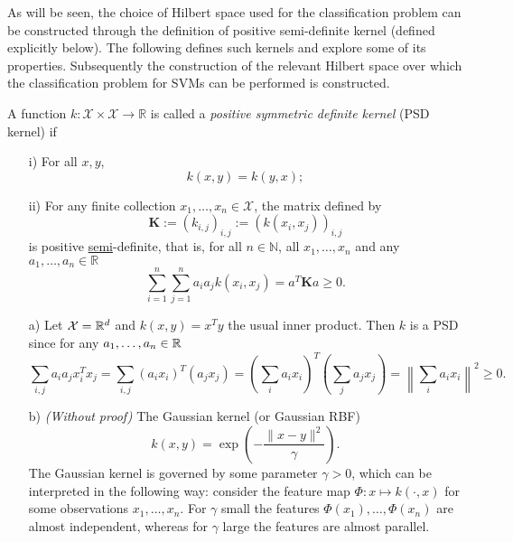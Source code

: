 As will be seen, the choice of Hilbert space used for the classification problem can be constructed through the definition of positive semi-definite kernel (defined explicitly below).  The following defines such kernels and explore some of its properties. Subsequently the construction of the relevant Hilbert space over which the classification problem for SVMs can be performed is constructed. 

\begin{definition}
A function $k\colon \mathcal{X}\times \mathcal{X} \rightarrow \mathbb{R}$ is called a \emph{positive symmetric definite kernel} (PSD kernel) if 
\begin{itemize}
	\item[i)] For all $x, y$, $$k(x, y)=k(y, x);$$
	\item[ii)] For any finite collection $x_1, \ldots, x_n \in \mathcal{X}$, the matrix defined by
	\begin{equation}
		\mathbf{K} := (k_{i,j})_{i,j} := (k(x_i, x_j))_{i,j}
	\end{equation}
	is positive \underline{semi}-definite, that is, for all $n\in \mathbb{N}$, all $x_1, \ldots, x_n$ and any $a_1, \ldots, a_n \in \mathbb{R}$ 
	\begin{equation*}
	 \sum_{i=1}^n\sum_{j=1}^n a_ia_j k(x_i, x_j) = a^T\mathbf{K}a \geq 0.
	\end{equation*}
\end{itemize}
\end{definition}

\begin{example}[Kernels]
\begin{itemize}
	\item[a)] Let $\mathcal{X} = \mathbb{R}^d$ and $k(x,y) = x^Ty$ the usual inner product. Then $k$ is a PSD since for any $a_1, \ldots, a_n \in \mathbb{R}$
	\begin{equation*}
		\sum_{i,j} a_ia_j x_i^Tx_j = \sum_{i,j} (a_ix_i)^T(a_j x_j) = (\sum_i a_ix_i)^T(\sum_j a_j x_j) = \left\|\sum_i a_i x_i \right\|^2 \geq 0.
	\end{equation*}
	\item[b)] \emph{(Without proof)} The Gaussian kernel (or Gaussian RBF) $$k(x, y) =  \exp\left(-\frac{\|x - y\|^2}{\gamma}\right).$$ 	
	The Gaussian kernel is governed by some parameter $\gamma >0$, which can be interpreted in the following way: consider the feature map $\Phi \colon x \mapsto k(\cdot, x)$ for some observations $x_1, \ldots, x_n$. For $\gamma$ small the features $\Phi(x_1),\ldots, \Phi(x_n)$ are almost independent, whereas for $\gamma$ large the features are almost parallel. 
\end{itemize}
\end{example}


